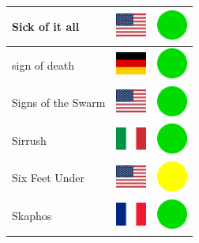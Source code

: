 \documentclass[12pt, a4paper, twoside]{report}
\begin{document}
\begin{center}
\begin{longtable}{|p{5cm}|p{2cm}|p{2cm}|}
 Sick of it all                                             & \includegraphics[width=1cm]{../4x3/us} &   \includegraphics[width=1cm]{../likes/y} \\ \hline
 sign of death                                              & \includegraphics[width=1cm]{../4x3/de} &   \includegraphics[width=1cm]{../likes/y} \\ \hline
 Signs of the Swarm                                         & \includegraphics[width=1cm]{../4x3/us} &   \includegraphics[width=1cm]{../likes/y} \\ \hline
 Sirrush                                                    & \includegraphics[width=1cm]{../4x3/it} &   \includegraphics[width=1cm]{../likes/y} \\ \hline
 Six Feet Under                                             & \includegraphics[width=1cm]{../4x3/us} &   \includegraphics[width=1cm]{../likes/m} \\ \hline
 Skaphos                                                    & \includegraphics[width=1cm]{../4x3/fr} &   \includegraphics[width=1cm]{../likes/y} \\ \hline

\end{longtable}
\end{center}
\end{document}
